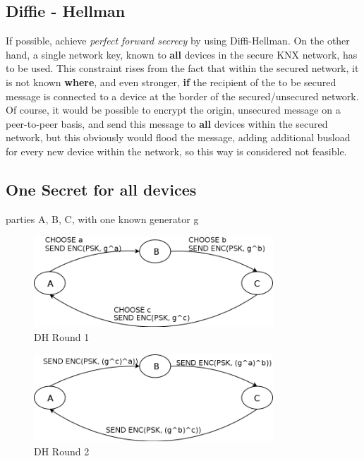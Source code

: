\subsection{Diffie - Hellman}


If possible, achieve \textit{perfect forward secrecy} by using Diffi-Hellman. On the other hand,
a single network key, known to \textbf{all} devices in the secure KNX network, has to be used. This 
constraint rises from the fact that within the secured network, it is not known \textbf{where}, and even stronger,
\textbf{if} the recipient of the to be secured message is connected to a device at the border of the secured/unsecured 
network. Of course, it would be possible to 
encrypt the origin, unsecured message on a peer-to-peer basis, and send this message to \textbf{all} devices
within the secured network, but this obviously would flood the message, adding additional busload for every new
device within the network, so this way is considered not feasible.

\subsection{One Secret for all devices}

parties A, B, C, with one known generator g

\begin{figure}
    \centering
    \includegraphics[width=0.8\textwidth]{figures/dh-group_round1.png}
    \caption{DH Round 1}
    \label{fig:dh1}
\end{figure}

\begin{figure}
    \centering
    \includegraphics[width=0.8\textwidth]{figures/dh-group_round2.png}
    \caption{DH Round 2}
    \label{fig:dh2}
\end{figure}

